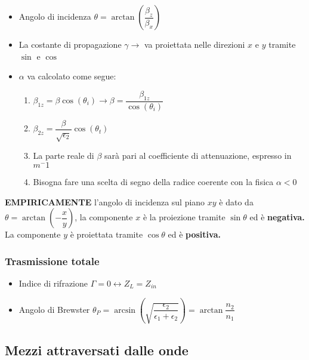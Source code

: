 \documentclass{article}
\begin{document}
\begin{itemize}
	\item Angolo di incidenza \( \theta = \arctan\left( \dfrac{\beta_z}{\beta_x} \right) \)
	\item La costante di propagazione \(\gamma \rightarrow\) va proiettata nelle direzioni \(x\) e \(y\) tramite \(\sin\) e \(\cos\)
	\item \(\alpha\) va calcolato come segue:
	      \begin{enumerate}
		      \item \(\beta_{1z} = \beta \cos(\theta_i) \rightarrow \beta = \dfrac{\beta_{1z}}{\cos(\theta_i)} \)
		      \item \( \beta_{2z} = \dfrac{\beta}{\sqrt{\epsilon_2}} \cos(\theta_t) \)
		      \item La parte reale di \(\beta\) sarà pari al coefficiente di attenuazione, espresso in \(m^-1\)
		      \item Bisogna fare una scelta di segno della radice coerente con la fisica \( \alpha < 0 \)
	      \end{enumerate}
\end{itemize}

\textbf{EMPIRICAMENTE} l'angolo di incidenza sul piano \(xy\) è dato da \(\theta = \arctan \left( - \dfrac{x}{y} \right) \), la componente \(x\) è la proiezione tramite \(\sin\theta\) ed è \textbf{negativa.} La componente \(y\) è proiettata tramite \(\cos\theta\) ed è \textbf{positiva.}

\subsubsection{Trasmissione totale}
\begin{itemize}
	\item Indice di rifrazione \( \Gamma = 0 \leftrightarrow Z_L = Z_{in} \)
	\item Angolo di Brewster \( \theta_P = \arcsin\left(\sqrt{\dfrac{\epsilon_2}{\epsilon_1 + \epsilon_2}}\right) = \arctan\dfrac{n_2}{n_1}\)
\end{itemize}

\subsection{Mezzi attraversati dalle onde}
\end{document}
